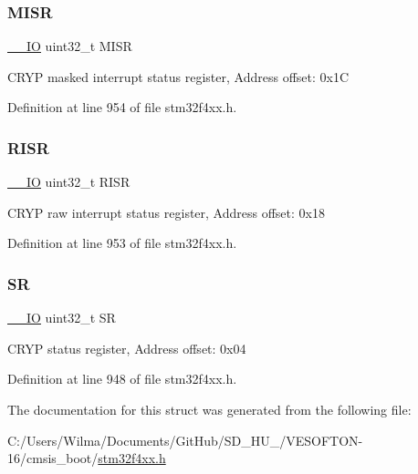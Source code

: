 \subsubsection{\texorpdfstring{M\+I\+SR}{MISR}}
{\footnotesize\ttfamily \hyperlink{group___c_m_s_i_s__core__definitions_gaec43007d9998a0a0e01faede4133d6be}{\+\_\+\+\_\+\+IO} uint32\+\_\+t M\+I\+SR}

C\+R\+YP masked interrupt status register, Address offset\+: 0x1C 

Definition at line 954 of file stm32f4xx.\+h.

\mbox{\label{struct_c_r_y_p___type_def_aa196fddf0ba7d6e3ce29bdb04eb38b94}} 
\subsubsection{\texorpdfstring{R\+I\+SR}{RISR}}
{\footnotesize\ttfamily \hyperlink{group___c_m_s_i_s__core__definitions_gaec43007d9998a0a0e01faede4133d6be}{\+\_\+\+\_\+\+IO} uint32\+\_\+t R\+I\+SR}

C\+R\+YP raw interrupt status register, Address offset\+: 0x18 

Definition at line 953 of file stm32f4xx.\+h.

\mbox{\label{struct_c_r_y_p___type_def_af6aca2bbd40c0fb6df7c3aebe224a360}} 
\subsubsection{\texorpdfstring{SR}{SR}}
{\footnotesize\ttfamily \hyperlink{group___c_m_s_i_s__core__definitions_gaec43007d9998a0a0e01faede4133d6be}{\+\_\+\+\_\+\+IO} uint32\+\_\+t SR}

C\+R\+YP status register, Address offset\+: 0x04 

Definition at line 948 of file stm32f4xx.\+h.



The documentation for this struct was generated from the following file\+:\begin{DoxyCompactItemize}
\item 
C\+:/\+Users/\+Wilma/\+Documents/\+Git\+Hub/\+S\+D\+\_\+\+H\+U\+\_/\+V\+E\+S\+O\+F\+T\+O\+N-\/16/cmsis\+\_\+boot/\hyperlink{stm32f4xx_8h}{stm32f4xx.\+h}\end{DoxyCompactItemize}
